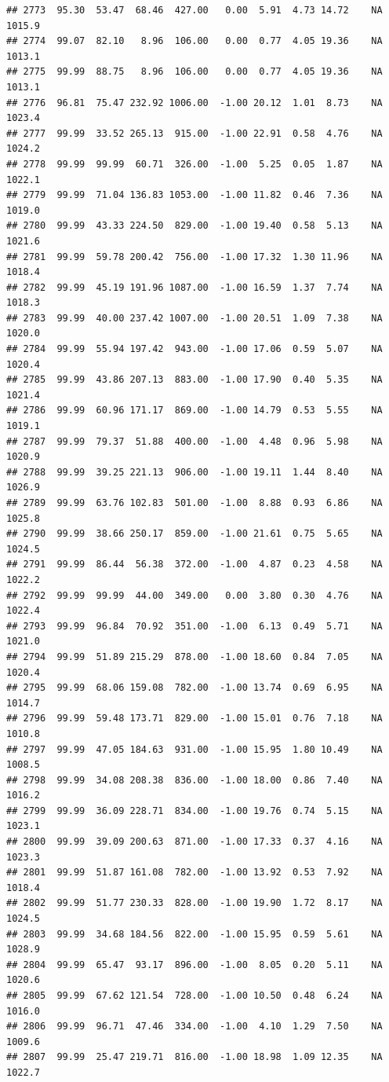 \documentclass{article}\usepackage{graphicx, color}
\makeatletter
\newenvironment{kframe}{%
 \def\at@end@of@kframe{}%
 \ifinner\ifhmode%
  \def\at@end@of@kframe{\end{minipage}}%
  \begin{minipage}{\columnwidth}%
 \fi\fi%
 \def\FrameCommand##1{\hskip\@totalleftmargin \hskip-\fboxsep
 \colorbox{shadecolor}{##1}\hskip-\fboxsep
     \hskip-\linewidth \hskip-\@totalleftmargin \hskip\columnwidth}%
 \MakeFramed {\advance\hsize-\width
   \@totalleftmargin\z@ \linewidth\hsize
   \@setminipage}}%
 {\par\unskip\endMakeFramed%
 \at@end@of@kframe}
\newenvironment{knitrout}{}{} %
\makeatother
\begin{document}
\begin{knitrout}
\begin{kframe}
\begin{verbatim}
## 2773  95.30  53.47  68.46  427.00   0.00  5.91  4.73 14.72    NA 1015.9
## 2774  99.07  82.10   8.96  106.00   0.00  0.77  4.05 19.36    NA 1013.1
## 2775  99.99  88.75   8.96  106.00   0.00  0.77  4.05 19.36    NA 1013.1
## 2776  96.81  75.47 232.92 1006.00  -1.00 20.12  1.01  8.73    NA 1023.4
## 2777  99.99  33.52 265.13  915.00  -1.00 22.91  0.58  4.76    NA 1024.2
## 2778  99.99  99.99  60.71  326.00  -1.00  5.25  0.05  1.87    NA 1022.1
## 2779  99.99  71.04 136.83 1053.00  -1.00 11.82  0.46  7.36    NA 1019.0
## 2780  99.99  43.33 224.50  829.00  -1.00 19.40  0.58  5.13    NA 1021.6
## 2781  99.99  59.78 200.42  756.00  -1.00 17.32  1.30 11.96    NA 1018.4
## 2782  99.99  45.19 191.96 1087.00  -1.00 16.59  1.37  7.74    NA 1018.3
## 2783  99.99  40.00 237.42 1007.00  -1.00 20.51  1.09  7.38    NA 1020.0
## 2784  99.99  55.94 197.42  943.00  -1.00 17.06  0.59  5.07    NA 1020.4
## 2785  99.99  43.86 207.13  883.00  -1.00 17.90  0.40  5.35    NA 1021.4
## 2786  99.99  60.96 171.17  869.00  -1.00 14.79  0.53  5.55    NA 1019.1
## 2787  99.99  79.37  51.88  400.00  -1.00  4.48  0.96  5.98    NA 1020.9
## 2788  99.99  39.25 221.13  906.00  -1.00 19.11  1.44  8.40    NA 1026.9
## 2789  99.99  63.76 102.83  501.00  -1.00  8.88  0.93  6.86    NA 1025.8
## 2790  99.99  38.66 250.17  859.00  -1.00 21.61  0.75  5.65    NA 1024.5
## 2791  99.99  86.44  56.38  372.00  -1.00  4.87  0.23  4.58    NA 1022.2
## 2792  99.99  99.99  44.00  349.00   0.00  3.80  0.30  4.76    NA 1022.4
## 2793  99.99  96.84  70.92  351.00  -1.00  6.13  0.49  5.71    NA 1021.0
## 2794  99.99  51.89 215.29  878.00  -1.00 18.60  0.84  7.05    NA 1020.4
## 2795  99.99  68.06 159.08  782.00  -1.00 13.74  0.69  6.95    NA 1014.7
## 2796  99.99  59.48 173.71  829.00  -1.00 15.01  0.76  7.18    NA 1010.8
## 2797  99.99  47.05 184.63  931.00  -1.00 15.95  1.80 10.49    NA 1008.5
## 2798  99.99  34.08 208.38  836.00  -1.00 18.00  0.86  7.40    NA 1016.2
## 2799  99.99  36.09 228.71  834.00  -1.00 19.76  0.74  5.15    NA 1023.1
## 2800  99.99  39.09 200.63  871.00  -1.00 17.33  0.37  4.16    NA 1023.3
## 2801  99.99  51.87 161.08  782.00  -1.00 13.92  0.53  7.92    NA 1018.4
## 2802  99.99  51.77 230.33  828.00  -1.00 19.90  1.72  8.17    NA 1024.5
## 2803  99.99  34.68 184.56  822.00  -1.00 15.95  0.59  5.61    NA 1028.9
## 2804  99.99  65.47  93.17  896.00  -1.00  8.05  0.20  5.11    NA 1020.6
## 2805  99.99  67.62 121.54  728.00  -1.00 10.50  0.48  6.24    NA 1016.0
## 2806  99.99  96.71  47.46  334.00  -1.00  4.10  1.29  7.50    NA 1009.6
## 2807  99.99  25.47 219.71  816.00  -1.00 18.98  1.09 12.35    NA 1022.7

\end{verbatim}
\end{kframe}
\end{knitrout}
\end{document}
